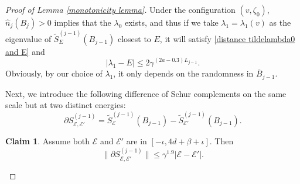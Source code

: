 \documentclass[11pt,reqno,UTF8,twoside]{amsart}
\newcommand{\mcE}{\mathcal{E}}
\newcommand{\whn}{\widehat{n}}
\newcommand{\barB}{\overline{B}}
\newcommand{\wtSjminusone}{\widetilde{S}^{(j-1)}}
\newcommand{\partialSjminusone}{\partial {S}^{(j-1)}}
\theoremstyle{definition}
\newtheorem{claim}[thm]{\bf Claim}
\numberwithin{equation}{section}
\begin{document}
\begin{proof}[Proof of Lemma \ref{monotonicity lemma}]
Under the configuration $(v,\zeta_0)$, $\whn_j(B_j)>0$ implies that the $\lambda_0$ exists, and thus if we take $\lambda_1=\lambda_1(v)$ as the eigenvalue of $\wtSjminusone_E(B_{j-1})$ closest to $E$, it will satisfy  \eqref{distance tildelambda0 and E} and 
\begin{equation}\label{distance lambda1 and E}
  |\lambda_1-E|\leq 2 \gamma^{(2a-0.3)L_{j-1}}.
\end{equation}
Obviously, by our choice of $\lambda_1$, it only depends on the randomness in $\barB_{j-1}$.






Next, we introduce the following difference of Schur complements on the same scale but at two distinct energies:
\begin{equation}\label{difference in energy}
  \partialSjminusone_{\mcE,\mcE'}= \wtSjminusone_\mcE(B_{j-1})-\wtSjminusone_{\mcE'}(B_{j-1}).
\end{equation}

\begin{claim}\label{estimate on difference in energy}
  Assume both $\mcE$ and $\mcE'$ are in $ [-\iota,4d+\beta+\iota]$. Then 
  \[ \| \partialSjminusone_{\mcE,\mcE'}  \| \leq \gamma^{1.9}|\mcE-\mcE'|.\]
\end{claim}


\end{proof}
\end{document}
